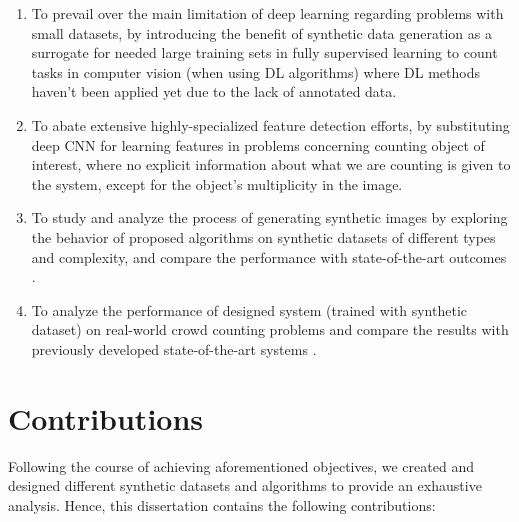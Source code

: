 \begin{enumerate}

\item To prevail over the main limitation of deep learning regarding problems with small datasets, by introducing the benefit of synthetic data generation as a surrogate for needed large training sets in fully supervised learning to count tasks in computer vision (when using DL algorithms) where DL methods haven't been applied yet due to the lack of annotated data.

\item To abate extensive highly-specialized feature detection efforts, by substituting deep CNN for learning features in problems concerning counting object of interest, where no explicit information about what we are counting is given to the system, except for the object's multiplicity in the image.


\item To study and analyze the process of generating synthetic images by exploring the behavior of proposed algorithms on synthetic datasets of different types and complexity, and compare the performance with state-of-the-art outcomes \cite{segui2015learning}. 


\item To analyze the performance of designed system (trained with synthetic dataset) on real-world crowd counting problems and compare the results with previously developed state-of-the-art systems \cite{chan2008privacy}.   
 

\end{enumerate}
\section{Contributions}
Following the course of achieving aforementioned objectives, we created and designed different synthetic datasets and algorithms to provide an exhaustive analysis. Hence, this dissertation contains the following contributions: 

